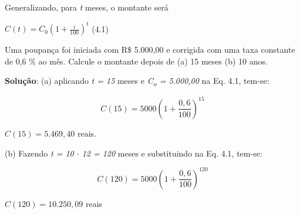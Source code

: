 Generalizando, para \textit{t} meses, o montante será

 \( C \left( t \right) =C_{0} \left( 1+\frac{i}{100} \right) ^{t} \)       (4.1)

\begin{texemplo}
Uma poupança foi iniciada com R$\$$  5.000,00 e corrigida com uma taxa constante de 0,6 $\%$  ao mês. Calcule o montante depois de (a) 15 meses (b) 10 anos.

\textbf{Solução}: (a) aplicando \textit{t = 15} meses e \textit{C\textsubscript{o} = 5.000,00} na Eq. 4.1, tem-se:

 \[  \]  \[ C \left( 15 \right) =5000 \left( 1+\frac{0,6}{100} \right) ^{15} \] 

  \( C \left( 15 \right) =5.469,40  \)  reais.

(b) Fazendo \textit{t = 10 $ \cdot $  12 = 120} meses e substituindo na Eq. 4.1, tem-se:

 \[  \]  \[ C \left( 120 \right) =5000 \left( 1+\frac{0,6}{100} \right) ^{120} \] 

  \( C \left( 120 \right) =10.250,09  \) reais \qedsymbol{}
\end{texemplo}

